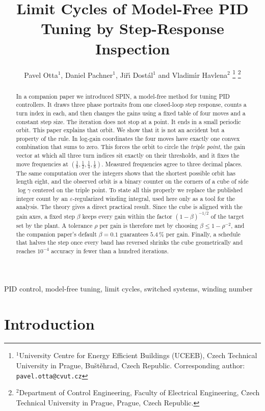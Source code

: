 \documentclass[letterpaper, 10pt, conference, twocolumn]{ieeeconf}
\title{Limit Cycles of Model-Free PID Tuning by Step-Response Inspection}
\author{Pavel Otta$^{1}$, Daniel Pachner$^{1}$, Ji\v{r}\'{\i} Dost\'al$^{1}$
and Vladim\'{\i}r Havlena$^{2}$%
\thanks{$^{1}$University Centre for Energy Efficient Buildings (UCEEB),
Czech Technical University in Prague, Bu\v{s}t\v{e}hrad, Czech Republic.
Corresponding author: \texttt{pavel.otta@cvut.cz}}%
\thanks{$^{2}$Department of Control Engineering, Faculty of Electrical
Engineering, Czech Technical University in Prague, Prague, Czech Republic.}%
}
\begin{document}
\maketitle

\begin{abstract}
In a companion paper we introduced SPIN, a model-free method for tuning
PID controllers. It draws three phase portraits from one closed-loop
step response, counts a turn index in each, and then changes the gains
using a fixed table of four moves and a constant step size. The
iteration does not stop at a point. It ends in a small periodic orbit.
This paper explains that orbit. We show that it is not an accident but a
property of the rule. In log-gain coordinates the four moves have
exactly one convex combination that sums to zero. This forces the orbit
to circle the \emph{triple point}, the gain vector at which all three
turn indices sit exactly on their thresholds, and it fixes the move
frequencies at $(\tfrac18, \tfrac12, \tfrac14, \tfrac18)$. Measured
frequencies agree to three decimal places. The same computation over the
integers shows that the shortest possible orbit has length eight, and
the observed orbit is a binary counter on the corners of a cube of side
$\log\gamma$ centered on the triple point. To state all this properly we
replace the published integer count by an $\varepsilon$-regularized
winding integral, used here only as a tool for the analysis. The theory
gives a direct practical result. Since the cube is aligned with the gain
axes, a fixed step $\beta$ keeps every gain within the factor
$(1-\beta)^{-1/2}$ of the target set by the plant. A tolerance $\rho$ per
gain is therefore met by choosing $\beta \le 1-\rho^{-2}$, and the
companion paper's default $\beta = 0.1$ guarantees $5.4\,\%$ per gain.
Finally, a schedule that halves the step once every band has reversed
shrinks the cube geometrically and reaches $10^{-4}$ accuracy in fewer
than a hundred iterations.
\end{abstract}

\begin{IEEEkeywords}
PID control, model-free tuning, limit cycles, switched systems,
winding number
\end{IEEEkeywords}

\section{Introduction}
\label{sec:intro}
\end{document}
